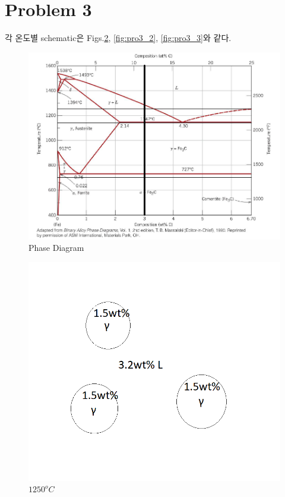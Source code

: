 \documentclass[a4paper]{oblivoir}
\begin{document}
\section{Problem 3}
각 온도별 schematic은 Figs.\ref{fig:pro3_1}, \ref{fig:pro3_2}, \ref{fig:pro3_3}와 같다.
\begin{figure}[htbp]
	\begin{centering}
	\includegraphics[width = 0.75\linewidth]{pro3.png}%
	\caption{\label{fig:pro3}  Phase Diagram}
	\end{centering}
\end{figure}
\begin{figure}[htbp]
	\begin{centering}
	\includegraphics[width = 0.75\linewidth]{pro3_1.png}%
	\caption{\label{fig:pro3_1} $1250^{o}C$}
	\end{centering}
\end{figure}
\end{document}

